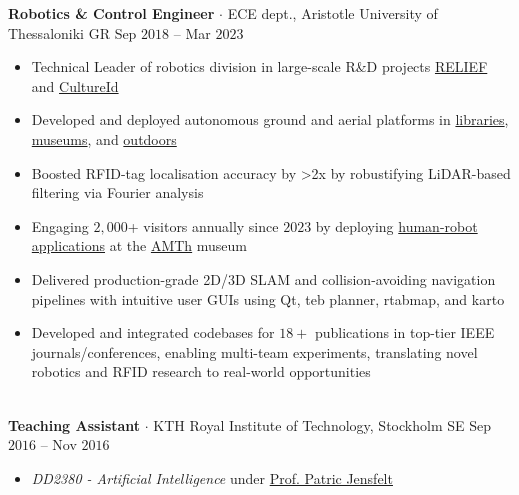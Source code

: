\documentclass[a4paper,10pt,twoside]{article}
\begin{document}
  \noindent\textbf{Robotics \& Control Engineer} $\cdot$ ECE dept., Aristotle University of Thessaloniki GR \hfill {\small \textcolor{agray}{Sep $2018$ -- Mar $2023$}} \\
  \begin{minipage}[t]{\textwidth}
    \begin{itemize}
      \item Technical Leader of robotics division in large-scale R\&D projects \href{https://relief.web.auth.gr/language/en/home/}{RELIEF} and \href{https://cultureid.web.auth.gr/?page\_id=200&lang=en}{CultureId} \verticalspaceafteritem
      \item Developed and deployed autonomous ground and aerial platforms in \href{https://www.youtube.com/watch?v=bo4lMI640DY}{libraries}, \href{https://youtu.be/2EvTGNOqTrs?t=17}{museums}, and \href{https://www.youtube.com/watch?v=0YFQzpWgEd4}{outdoors}\verticalspaceafteritem
      \item Boosted RFID-tag localisation accuracy by >2x by robustifying LiDAR-based filtering via Fourier analysis\verticalspaceafteritem
      \item Engaging $2,000$+ visitors annually since $2023$ by deploying \href{https://www.youtube.com/watch?v=mrTL3Gep7Xk&t=36s}{human-robot applications} at the \href{https://www.amth.gr/en}{AMTh} museum\verticalspaceafteritem
      \item Delivered production-grade 2D/3D SLAM and collision-avoiding navigation pipelines with intuitive user GUIs using Qt, teb planner, rtabmap, and karto\verticalspaceafteritem
      \item Developed and integrated codebases for $18+$ publications in top-tier IEEE journals/conferences, enabling multi-team experiments, translating novel robotics and RFID research to real-world opportunities
    \end{itemize}
  \end{minipage} \\[0.2em]

  \noindent\textbf{Teaching Assistant} $\cdot$ KTH Royal Institute of Technology, Stockholm SE \hfill {\small \textcolor{agray}{Sep $2016$ -- Nov $2016$}} \\
  \begin{minipage}[t]{\textwidth}
    \begin{itemize}
      \item \textit{DD2380 - Artificial Intelligence} under \href{https://www.kth.se/profile/patric}{Prof. Patric Jensfelt}
    \end{itemize}
  \end{minipage} \\[-1em]
\verticalspacebetweensections
\end{document}
